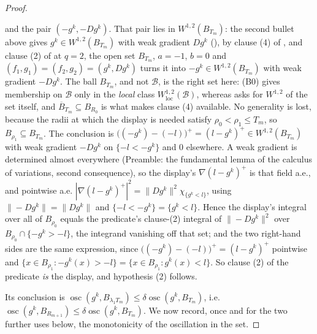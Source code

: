 \begin{proof}
\begin{itemize}
  and the pair $(-g^k,-Dg^k)$.  That pair lies in $W^{1,2}(B_{T_m})$: the second
  bullet above gives $g^k\in W^{1,2}(B_{T_m})$ with weak gradient $Dg^k$
  (), by clause (4) of , and
  clause (2) of  at $q=2$, the open set $B_{T_m}$,
  $a=-1$, $b=0$ and $(f_1,g_1)=(f_2,g_2)=(g^k,Dg^k)$ turns it into
  $-g^k\in W^{1,2}(B_{T_m})$ with weak gradient $-Dg^k$.  The ball $B_{T_m}$, and
  not $\mathcal B$, is the right set here: (B0) gives membership on $\mathcal B$
  only in the \emph{local} class $W^{1,2}_{\mathrm{loc}}(\mathcal B)$, whereas
   asks for $W^{1,2}$ of the set itself, and
  $\overline B_{T_m}\subseteq B_{R_0}$ is what makes clause (4) available.  No
  generality is lost, because the radii at which the display is needed satisfy
  $\rho_0<\rho_1\le T_m$, so $B_{\rho_1}\subseteq B_{T_m}$.  The conclusion is
  $\bigl((-g^k)-(-l)\bigr)^+=(l-g^k)^+\in W^{1,2}(B_{T_m})$ with weak gradient
  $-Dg^k$ on $\{-l<-g^k\}$ and $0$ elsewhere.  A weak gradient is determined
  almost everywhere (Preamble: the fundamental lemma of the calculus of
  variations, second consequence), so the display's $\nabla(l-g^k)^+$ is that
  field a.e., and pointwise a.e.
  $|\nabla(l-g^k)^+|^2=\|Dg^k\|^2\chi_{\{g^k<l\}}$, using $\|-Dg^k\|=\|Dg^k\|$
  and $\{-l<-g^k\}=\{g^k<l\}$.  Hence the display's integral over all of
  $B_{\rho_0}$ equals the predicate's clause-(2) integral of $\|-Dg^k\|^2$ over
  $B_{\rho_0}\cap\{-g^k>-l\}$, the integrand vanishing off that set; and the two
  right-hand sides are the same expression, since
  $\bigl((-g^k)-(-l)\bigr)^+=(l-g^k)^+$ pointwise and
  $\{x\in B_{\rho_1}:-g^k(x)>-l\}=\{x\in B_{\rho_1}:g^k(x)<l\}$.  So clause (2)
  of the predicate \emph{is} the display, and hypothesis (2) follows.
\end{itemize}
Its conclusion is
$\operatorname*{osc}(g^k,B_{\lambda_1T_m})\le\delta\operatorname*{osc}(g^k,B_{T_m})$,
i.e.\ $\operatorname*{osc}(g^k,B_{R_{m+1}})\le\delta\operatorname*{osc}(g^k,B_{T_m})$.
We now record, once and for the two further uses below, the monotonicity of the
oscillation in the set.


\end{proof}
